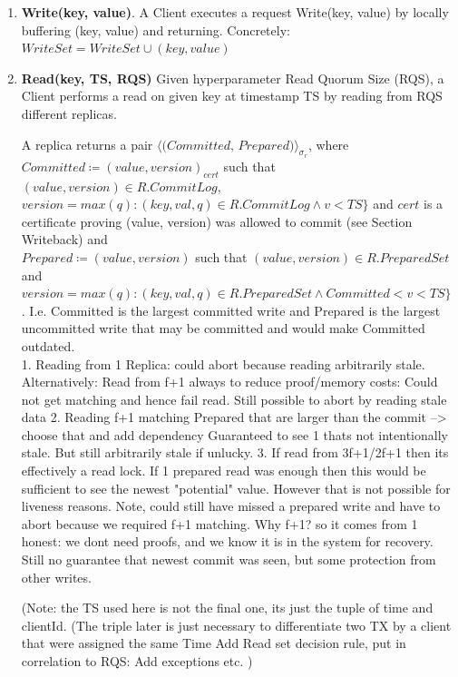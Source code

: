 \begin{enumerate}
\item \textbf{Write(key, value)}. A Client executes a request Write(key, value) by locally buffering (key, value) and returning. Concretely: $WriteSet = WriteSet \cup (key, value)$
\item \textbf{Read(key, TS, RQS)} Given hyperparameter Read Quorum Size (RQS), a Client performs a read on given key at timestamp TS by reading from RQS different replicas. \\


A replica returns a pair $\langle \textit{(Committed, Prepared)} \rangle _{\sigma_r}$, where \\
$Committed \coloneqq (value, version)_{cert}$ such that $ (value, version) \in R.CommitLog$, $version = max(q) : (key, val, q) \in R.CommitLog \land v < TS \}$ and $cert$ is a certificate proving (value, version) was allowed to commit (see Section Writeback) and\\
 $Prepared \coloneqq (value, version)$ such that $(value, version) \in R.PreparedSet$ and $version = max(q) : (key, val, q) \in R.PreparedSet \land Committed < v < TS \}$ .
I.e. Committed is the largest committed write and Prepared is the largest uncommitted write that may be  committed and would make Committed outdated. \\

1. Reading from 1 Replica: could abort because reading arbitrarily stale.
Alternatively: Read from f+1 always to reduce proof/memory costs: Could not get matching and hence fail read. Still possible to abort by reading stale data 
2. Reading f+1 matching Prepared that are larger than the commit --> choose that and add dependency
Guaranteed to see 1 thats not intentionally stale. But still arbitrarily stale if unlucky.
3. If read from 3f+1/2f+1 then its effectively a read lock. 
If 1 prepared read was enough then this would be sufficient to see the newest "potential" value. However that is not possible for liveness reasons.
Note, could still have missed a prepared write and have to abort because we required f+1 matching. Why f+1? so it comes from 1 honest: we dont need proofs, and we know it is in the system for recovery.
Still no guarantee that newest commit was seen, but some protection from other writes.



(Note: the TS used here is not the final one, its just the tuple of time and clientId. (The triple later is just necessary to differentiate two TX by a client that were assigned the same Time
Add Read set decision rule, put in correlation to RQS: 
Add exceptions etc.
)



\end{enumerate}
